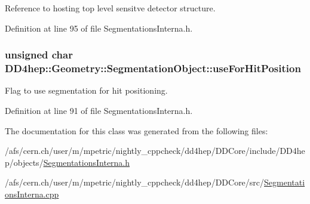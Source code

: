 Reference to hosting top level sensitve detector structure. 

Definition at line 95 of file SegmentationsInterna.h.\hypertarget{class_d_d4hep_1_1_geometry_1_1_segmentation_object_a50926f063e074096e83ee667d70114a7}{
\subsubsection[{useForHitPosition}]{\setlength{\rightskip}{0pt plus 5cm}unsigned char {\bf DD4hep::Geometry::SegmentationObject::useForHitPosition}}}
\label{class_d_d4hep_1_1_geometry_1_1_segmentation_object_a50926f063e074096e83ee667d70114a7}


Flag to use segmentation for hit positioning. 

Definition at line 91 of file SegmentationsInterna.h.

The documentation for this class was generated from the following files:\begin{DoxyCompactItemize}
\item 
/afs/cern.ch/user/m/mpetric/nightly\_\-cppcheck/dd4hep/DDCore/include/DD4hep/objects/\hyperlink{_segmentations_interna_8h}{SegmentationsInterna.h}\item 
/afs/cern.ch/user/m/mpetric/nightly\_\-cppcheck/dd4hep/DDCore/src/\hyperlink{_segmentations_interna_8cpp}{SegmentationsInterna.cpp}\end{DoxyCompactItemize}

